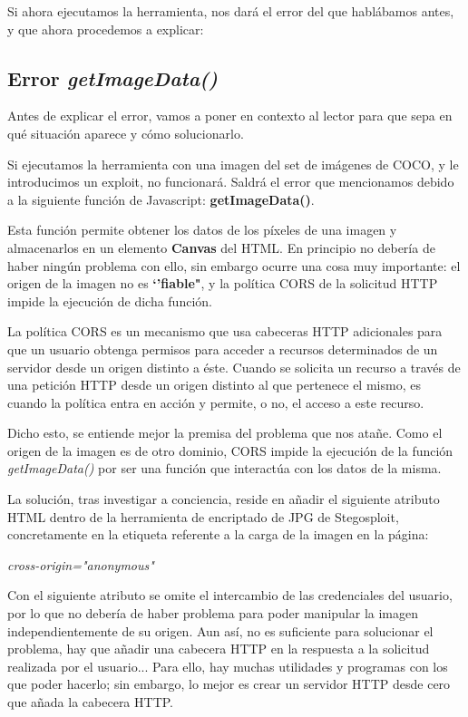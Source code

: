 Si ahora ejecutamos la herramienta, nos dará el error del que hablábamos antes, y que ahora procedemos a explicar:

\subsection{Error \textit{getImageData()}}

Antes de explicar el error, vamos a poner en contexto al lector para que sepa en qué situación aparece y cómo solucionarlo.


Si ejecutamos la herramienta con una imagen del set de imágenes de COCO, y le introducimos un exploit, no funcionará. Saldrá el error que mencionamos debido a la siguiente función de Javascript: \textbf{getImageData()}.

Esta función permite obtener los datos de los píxeles de una imagen y almacenarlos en un elemento \textbf{Canvas} del HTML. En principio no debería de haber ningún problema con ello, sin embargo ocurre una cosa muy importante: el origen de la imagen no es \textbf{`'fiable"}, y la política \ac{CORS} de la solicitud HTTP impide la ejecución de dicha función. %

La política \ac{CORS} es un mecanismo que usa cabeceras HTTP adicionales para que un usuario obtenga permisos para acceder a recursos determinados de un servidor desde un origen distinto a éste. Cuando se solicita un recurso a través de una petición HTTP desde un origen distinto al que pertenece el mismo, es cuando la política entra en acción y permite, o no, el acceso a este recurso. %

Dicho esto, se entiende mejor la premisa del problema que nos atañe. Como el origen de la imagen es de otro dominio, \ac{CORS} impide la ejecución de la función \textit{getImageData()} por ser una función que interactúa con los datos de la misma.

La solución, tras investigar a conciencia, reside en añadir el siguiente atributo HTML dentro de la herramienta de encriptado de JPG de Stegosploit, concretamente en la etiqueta referente a la carga de la imagen en la página: %

\begin{center}
\textit{cross-origin="anonymous"}
\end{center}

Con el siguiente atributo se omite el intercambio de las credenciales del usuario, por lo que no debería de haber problema para poder manipular la imagen independientemente de su origen. Aun así, no es suficiente para solucionar el problema, hay que añadir una cabecera HTTP en la respuesta a la solicitud realizada por el usuario... Para ello, hay muchas utilidades y programas con los que poder hacerlo; sin embargo, lo mejor es crear un servidor HTTP desde cero que añada la cabecera HTTP.

